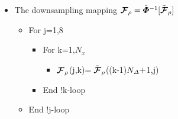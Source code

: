 \begin{figure}
{\begin{minipage} {140.0mm}
\begin{tt}
\begin{itemize}
\end{itemize}

\vspace{2 mm}

\begin{itemize}
\item The downsampling  mapping ${\mbox{\boldmath$\cal F$\unboldmath}}_{\rho}=\hat{\mbox{\boldmath$\mit \Phi$\unboldmath}}{}^{-1}[\tilde{\mbox{\boldmath$\cal F$\unboldmath}}_{\rho}]$
\begin{itemize}
\item For j=1,8
\begin{itemize}
\item For k=1,$N_x$
\begin{itemize}
\item ${\mbox{\boldmath$\cal F$\unboldmath}}_{\rho}$(j,k)$=\tilde{\mbox{\boldmath$\cal F$\unboldmath}}_{\rho}$((k-1)$N_{\mit 
\Delta}+$1,j)
\end{itemize}
\item End !k-loop
\end{itemize}
\item End !j-loop
\end{itemize}
\end{itemize}

\end{tt} 

\vspace{2 mm}
\end{minipage}
}
\end{figure}

